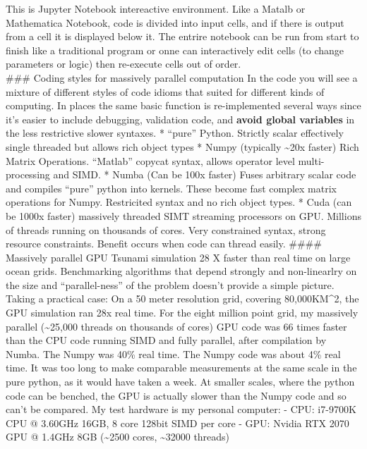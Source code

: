 \documentclass[11pt]{article}
\begin{document}
This is Jupyter Notebook intereactive environment. Like a Matalb or
Mathematica Notebook, code is divided into input cells, and if there is
output from a cell it is displayed below it. The entrire notebook can be
run from start to finish like a traditional program or onne can
interactively edit cells (to change parameters or logic) then re-execute
cells out of order.\\
\#\#\# Coding styles for massively parallel computation In the code you
will see a mixture of different styles of code idioms that suited for
different kinds of computing. In places the same basic function is
re-implemented several ways since it's easier to include debugging,
validation code, and \textbf{avoid global variables} in the less
restrictive slower syntaxes. * ``pure'' Python. Strictly scalar
effectively single threaded but allows rich object types * Numpy
(typically \textasciitilde{}20x faster) Rich Matrix Operations.
``Matlab'' copycat syntax, allows operator level multi-processing and
SIMD. * Numba (Can be 100x faster) Fuses arbitrary scalar code and
compiles ``pure'' python into kernels. These become fast complex matrix
operations for Numpy. Restricited syntax and no rich object types. *
Cuda (can be 1000x faster) massively threaded SIMT streaming processors
on GPU. Millions of threads running on thousands of cores. Very
constrained syntax, strong resource constraints. Benefit occurs when
code can thread easily. \#\#\#\# Massively parallel GPU Tsunami
simulation 28 X faster than real time on large ocean grids. Benchmarking
algorithms that depend strongly and non-linearlry on the size and
``parallel-ness'' of the problem doesn't provide a simple picture.
Taking a practical case: On a 50 meter resolution grid, covering
80,000KM\^{}2, the GPU simulation ran 28x real time. For the eight
million point grid, my massively parallel (\textasciitilde{}25,000
threads on thousands of cores) GPU code was 66 times faster than the CPU
code running SIMD and fully parallel, after compilation by Numba. The
Numpy was 40\% real time. The Numpy code was about 4\% real time. It was
too long to make comparable measurements at the same scale in the pure
python, as it would have taken a week. At smaller scales, where the
python code can be benched, the GPU is actually slower than the Numpy
code and so can't be compared. My test hardware is my personal computer:
- CPU: i7-9700K CPU @ 3.60GHz 16GB, 8 core 128bit SIMD per core - GPU:
Nvidia RTX 2070 GPU @ 1.4GHz 8GB (\textasciitilde{}2500 cores,
\textasciitilde{}32000 threads)
\end{document}

